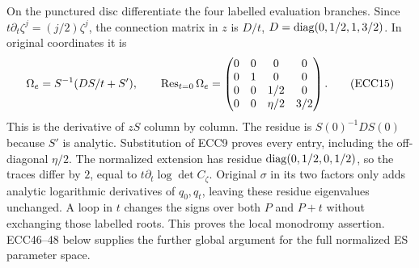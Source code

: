 \documentclass[11pt]{article}
\begin{document}
On the punctured disc differentiate the four labelled evaluation
branches. Since $t\partial_t\zeta^j=(j/2)\zeta^j$, the connection matrix
in $z$ is $D/t$, $D=\operatorname{diag}(0,1/2,1,3/2)$. In original coordinates it is
\begin{equation}
 \Omega_e=S^{-1}(DS/t+S'),\qquad
 \operatorname{Res}_{t=0}\Omega_e=
 \begin{pmatrix}0&0&0&0\\0&1&0&0\\
 0&0&1/2&0\\0&0&\eta/2&3/2\end{pmatrix}.
 \tag{ECC15}
\end{equation}
This is the derivative of $zS$ column by column. The residue is
$S(0)^{-1}DS(0)$ because $S'$ is analytic. Substitution of ECC9 proves
every entry, including the off-diagonal $\eta/2$. The normalized extension
has residue $\operatorname{diag}(0,1/2,0,1/2)$, so the traces differ by $2$, equal to
$t\partial_t\log\det C_\zeta$. Original $\sigma$ in its two factors
only adds analytic logarithmic derivatives of $q_0,q_t$, leaving these
residue eigenvalues unchanged. A loop in $t$ changes the signs over both
$P$ and $P+t$ without exchanging those labelled roots. This proves the
local monodromy assertion. ECC46--48 below supplies the further global
argument for the full normalized ES parameter space.
\end{document}
